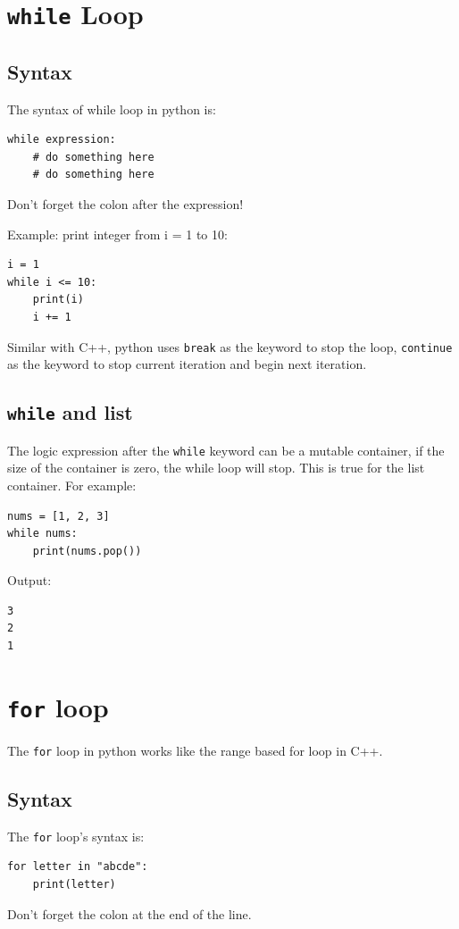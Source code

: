 \documentclass[12pt]{book}
\begin{document}
\section{\texttt{while} Loop}
\label{sec:org877eeca}
\subsection{Syntax}
\label{sec:org690aa01}
The syntax of while loop in python is:
\begin{verbatim}
while expression:
    # do something here
    # do something here
\end{verbatim}
Don't forget the colon after the expression!

Example: print integer from i = 1 to 10:
\begin{verbatim}
i = 1
while i <= 10:
    print(i)
    i += 1
\end{verbatim}

Similar with C++, python uses \texttt{break} as the keyword to stop the loop, \texttt{continue} as the keyword to stop current iteration and begin next iteration.
\subsection{\texttt{while} and list}
\label{sec:org38c137d}
The logic expression after the \texttt{while} keyword can be a mutable container, if the size of the container is zero, the while loop will stop. This is true for the list container. For example:
\begin{verbatim}
nums = [1, 2, 3]
while nums:
    print(nums.pop())   
\end{verbatim}
Output:
\begin{verbatim}
3
2
1
\end{verbatim}

\section{\texttt{for} loop}
\label{sec:org93a14d8}
The \texttt{for} loop in python works like the range based for loop in C++.
\subsection{Syntax}
\label{sec:orge69ac6c}
The \texttt{for} loop's syntax is:
\begin{verbatim}
for letter in "abcde":
    print(letter)
\end{verbatim}
Don't forget the colon at the end of the line.
\end{document}

